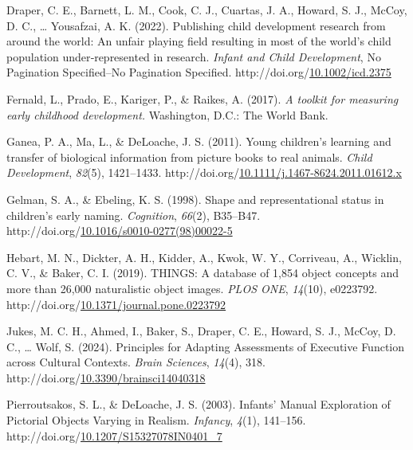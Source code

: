 \documentclass[10pt, letterpaper]{article}
\begin{document}
\begin{CSLReferences}{1}{0}
Draper, C. E., Barnett, L. M., Cook, C. J., Cuartas, J. A., Howard, S.
J., McCoy, D. C., \ldots{} Yousafzai, A. K. (2022). Publishing child
development research from around the world: {An} unfair playing field
resulting in most of the world's child population under‐represented in
research. \emph{Infant and Child Development}, No Pagination
Specified--No Pagination Specified.
http://doi.org/\href{https://doi.org/10.1002/icd.2375}{10.1002/icd.2375}

Fernald, L., Prado, E., Kariger, P., \& Raikes, A. (2017). \emph{A
toolkit for measuring early childhood development.} Washington, D.C.:
The World Bank.

Ganea, P. A., Ma, L., \& DeLoache, J. S. (2011). Young children's
learning and transfer of biological information from picture books to
real animals. \emph{Child Development}, \emph{82}(5), 1421--1433.
http://doi.org/\href{https://doi.org/10.1111/j.1467-8624.2011.01612.x}{10.1111/j.1467-8624.2011.01612.x}

Gelman, S. A., \& Ebeling, K. S. (1998). Shape and representational
status in children's early naming. \emph{Cognition}, \emph{66}(2),
B35--B47.
http://doi.org/\href{https://doi.org/10.1016/s0010-0277(98)00022-5}{10.1016/s0010-0277(98)00022-5}

Hebart, M. N., Dickter, A. H., Kidder, A., Kwok, W. Y., Corriveau, A.,
Wicklin, C. V., \& Baker, C. I. (2019). {THINGS}: {A} database of 1,854
object concepts and more than 26,000 naturalistic object images.
\emph{PLOS ONE}, \emph{14}(10), e0223792.
http://doi.org/\href{https://doi.org/10.1371/journal.pone.0223792}{10.1371/journal.pone.0223792}

Jukes, M. C. H., Ahmed, I., Baker, S., Draper, C. E., Howard, S. J.,
McCoy, D. C., \ldots{} Wolf, S. (2024). Principles for {Adapting}
{Assessments} of {Executive} {Function} across {Cultural} {Contexts}.
\emph{Brain Sciences}, \emph{14}(4), 318.
http://doi.org/\href{https://doi.org/10.3390/brainsci14040318}{10.3390/brainsci14040318}

Pierroutsakos, S. L., \& DeLoache, J. S. (2003). Infants' {Manual}
{Exploration} of {Pictorial} {Objects} {Varying} in {Realism}.
\emph{Infancy}, \emph{4}(1), 141--156.
http://doi.org/\href{https://doi.org/10.1207/S15327078IN0401_7}{10.1207/S15327078IN0401\_7}


\end{CSLReferences}
\end{document}

